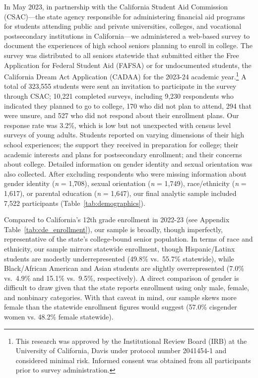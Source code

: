 In May 2023, in partnership with the California Student Aid Commission
(CSAC)---the state agency responsible for administering financial aid
programs for students attending public and private universities,
colleges, and vocational postsecondary institutions in California---we
administered a web-based survey to document the experiences of high
school seniors planning to enroll in college. The survey was distributed
to all seniors statewide that submitted either the Free Application for
Federal Student Aid (FAFSA) or for undocumented students, the California
Dream Act Application (CADAA) for the 2023-24 academic year.\footnote{This research was approved by the Institutional Review Board (IRB) at the University of California, Davis under protocol number 2041454-1 and considered minimal risk. Informed consent was obtained from all participants prior to survey administration.} A total
of 323,555 students were sent an invitation to participate in the survey
through CSAC; 10,221 completed surveys, including 9,230 respondents who
indicated they planned to go to college, 170 who did not plan to attend,
294 that were unsure, and 527 who did not respond about their enrollment
plans. Our response rate was 3.2\%, which is low but not unexpected with
census level surveys of young adults. Students reported on varying
dimensions of their high school experiences; the support they received
in preparation for college; their academic interests and plans for
postsecondary enrollment; and their concerns about college. Detailed
information on gender identity and sexual orientation was also
collected. After excluding respondents who were missing information
about gender identity (\emph{n} = 1,708), sexual orientation (\emph{n} = 1,749),
race/ethnicity (\emph{n} = 1,617), or parental education (\emph{n} = 1,647), our
final analytic sample included 7,522 participants (Table~\ref{tab:demographics}).

Compared to California's 12th grade enrollment in 2022-23 (see Appendix
Table~\ref{tab:cde_enrollment}), our sample is broadly, though imperfectly, representative of
the state's college-bound senior population. In terms of race and
ethnicity, our sample mirrors statewide enrollment, though
Hispanic/Latinx students are modestly underrepresented (49.8\% vs.~55.7\%
statewide), while Black/African American and Asian students are slightly
overrepresented (7.0\% vs.~4.9\% and 15.1\% vs.~9.5\%, respectively). A
direct comparison of gender is difficult to draw given that the state
reports enrollment using only male, female, and nonbinary categories.
With that caveat in mind, our sample skews more female than the
statewide enrollment figures would suggest (57.0\% cisgender women vs.
48.2\% female statewide).

